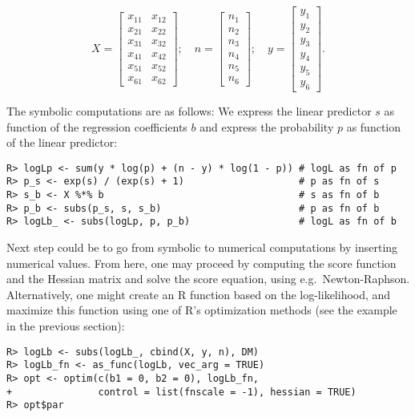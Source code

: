 \begin{equation}
 X=\left[\begin{matrix}x_{11} & x_{12}\\x_{21} & x_{22}\\x_{31} & x_{32}\\x_{41} & x_{42}\\x_{51} & x_{52}\\x_{61} & x_{62}\end{matrix}\right]; \quad
 n=\left[\begin{matrix}n_{1}\\n_{2}\\n_{3}\\n_{4}\\n_{5}\\n_{6}\end{matrix}\right]; \quad
 y=\left[\begin{matrix}y_{1}\\y_{2}\\y_{3}\\y_{4}\\y_{5}\\y_{6}\end{matrix}\right] .
\end{equation}

The symbolic computations are as follows: We express the linear predictor \(s\) as function of the regression coefficients \(b\) and express the probability \(p\) as function of the linear predictor:

\begin{verbatim}
R> logLp <- sum(y * log(p) + (n - y) * log(1 - p)) # logL as fn of p
R> p_s <- exp(s) / (exp(s) + 1)                    # p as fn of s
R> s_b <- X %*% b                                  # s as fn of b
R> p_b <- subs(p_s, s, s_b)                        # p as fn of b
R> logLb_ <- subs(logLp, p, p_b)                   # logL as fn of b
\end{verbatim}

Next step could be to go from symbolic to numerical computations by
inserting numerical values. From here, one may proceed by computing
the score function and the Hessian matrix and solve the score
equation, using e.g.~Newton-Raphson. Alternatively, one might create an
R function based on the log-likelihood, and maximize this function
using one of R's optimization methods (see the example in the
previous section):

\begin{verbatim}
R> logLb <- subs(logLb_, cbind(X, y, n), DM)
R> logLb_fn <- as_func(logLb, vec_arg = TRUE)
R> opt <- optim(c(b1 = 0, b2 = 0), logLb_fn, 
+               control = list(fnscale = -1), hessian = TRUE)
R> opt$par
\end{verbatim}

